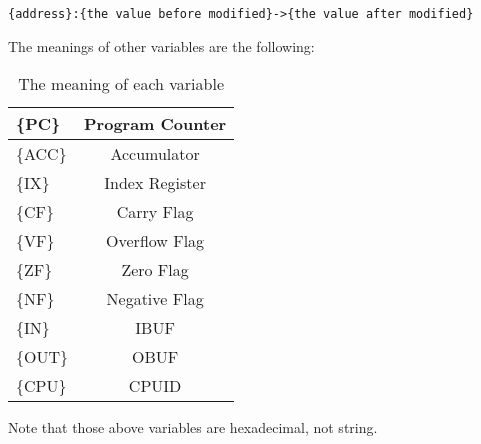 \documentclass[a4paper]{article}
\begin{document}
        \begin{verbatim}
{address}:{the value before modified}->{the value after modified}
        \end{verbatim}
        
        The meanings of other variables are the following:
        
        \begin{table}[htb]
            \begin{center}
                \caption{The meaning of each variable}
                \begin{tabular}{|l|c|}
                    \hline \{PC\}&Program Counter\\
                    \hline \{ACC\}&Accumulator\\
                    \hline \{IX\}&Index Register\\
                    \hline \{CF\}&Carry Flag\\
                    \hline \{VF\}&Overflow Flag\\
                    \hline \{ZF\}&Zero Flag\\
                    \hline \{NF\}&Negative Flag\\
                    \hline \{IN\}&IBUF\\
                    \hline \{OUT\}&OBUF\\
                    \hline \{CPU\}&CPUID\\
                    \hline
                \end{tabular}
            \end{center}
        \end{table}
        
        Note that those above variables are hexadecimal, not string.
\end{document}
